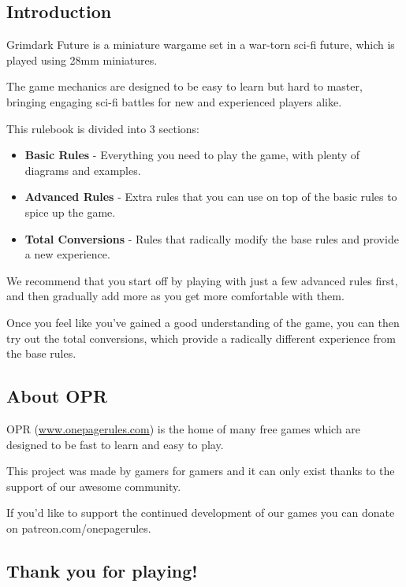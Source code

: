 \documentclass[9pt, a4paper]{extarticle}            %
\begin{document}
\begin{multicols}{2}

\subsection*{Introduction}

Grimdark Future is a miniature wargame set in a war-torn sci-fi future, which is played using 28mm miniatures.

The game mechanics are designed to be easy to learn but hard to master, bringing engaging sci-fi battles for new and experienced players alike.

This rulebook is divided into 3 sections:

\begin{itemize}
  \item \textbf{Basic Rules} - Everything you need to play the game, with plenty of diagrams and examples.
  \item \textbf{Advanced Rules} - Extra rules that you can use on top of the basic rules to spice up the game.
  \item \textbf{Total Conversions} - Rules that radically modify the base rules and provide a new experience.
\end{itemize}

We recommend that you start off by playing with just a few advanced rules first, and then gradually add more as you get more comfortable with them.

Once you feel like you’ve gained a good understanding of the game, you can then try out the total conversions, which provide a radically different experience from the base rules.

\subsection{About OPR}

OPR (\href{http://www.onepagerules.com}{www.onepagerules.com}) is the home of many free games which are designed to be fast to learn and easy to play.

This project was made by gamers for gamers and it can only exist thanks to the support of our awesome community.

If you’d like to support the continued development of our games you can donate on patreon.com/onepagerules.

\subsection{Thank you for playing!}
\vspace{10 mm}


\end{multicols}
\end{document}

